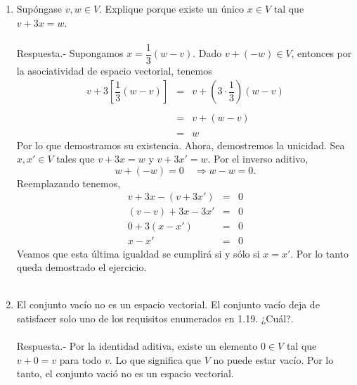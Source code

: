 \begin{enumerate}[\bfseries 1.]
    \item Supóngase $v,w\in V$. Explique porque existe un único $x\in V$ tal que $v+3x=w$.\\\\
	Respuesta.-\; Supongamos $x=\dfrac{1}{3}(w-v)$. Dado $v+(-w)\in V$, entonces  por la asociatividad de espacio vectorial, tenemos
	$$\begin{array}{rcl}
	    v+3\left[\dfrac{1}{3}(w-v)\right] &=& v + \left(3\cdot\dfrac{1}{3}\right)(w-v)\\\\
	    &=& v+(w-v)\\\\
	    &=& w
	\end{array}$$
	Por lo que demostramos su existencia. Ahora, demostremos la unicidad. Sea $x,x'\in V$ tales que $v+3x=w$ y $v+3x'=w$. Por el inverso aditivo, 
	$$w+(-w)=0 \quad \Rightarrow w-w=0.$$
	Reemplazando tenemos,
	$$\begin{array}{rcl}
	    v+3x-(v+3x') &=&0\\
	    (v-v) + 3x-3x' &=&0\\
	    0+3(x-x')&=&0\\
	    x-x'&=&0
	\end{array}$$
	Veamos que esta última igualdad se cumplirá si y sólo si $x=x'$. Por lo tanto queda demostrado el ejercicio.\\\\


    \item El conjunto vacío no es un espacio vectorial. El conjunto vacío deja de satisfacer solo uno de los requisitos enumerados en 1.19. ¿Cuál?.\\\\
	Respuesta.-\; Por la identidad aditiva, existe un elemento $0\in V$ tal que $v+0=v$ para todo $v$. Lo que significa que $V$ no puede estar vacío. Por lo tanto, el conjunto vació no es un espacio vectorial.\\\\


\end{enumerate}
